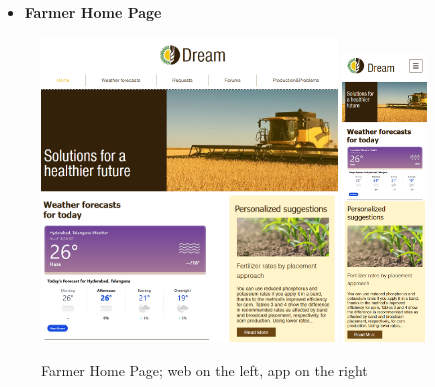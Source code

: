 \documentclass{article}
\begin{document}
    \begin{itemize}
        \item \textbf{Farmer Home Page}
    \end{itemize}
        \begin{figure} [h]
            \centering
            \includegraphics[width=0.7\textwidth]{images/UserInterfaces/Farmer/FarmerHomePageWeb.png}
            \quad
            \includegraphics[width=0.2\textwidth]{images/UserInterfaces/Farmer/FarmerHomePageApp.png}
            \quad
            \caption{\label{fig:farmerHomePage}Farmer Home Page; web on the left, app on the right}
        \end{figure}
        
    \newpage
    
\end{document}
